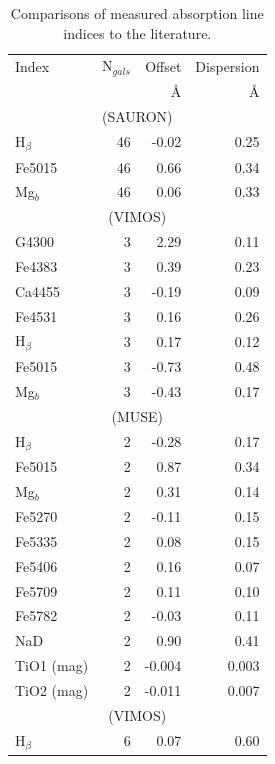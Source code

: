 	\begin{table}
		\centering
	\begin{threeparttable}
		\caption{Comparisons of measured absorption line indices to the literature.}
		\label{tab:litAbsorption}
		\begin{tabular}{l r r r}
			\hline
			\hline
			Index 		& N$_{gals}$ & Offset 	& Dispersion \\
						& 			& \AA		& \AA \\
			\hline
			\multicolumn{4}{c}{\citet{Vazdekis2010} (SAURON)} \\
			\hline
			H$_\beta$ 	& 46		& -0.02		& 0.25	\\
			Fe5015		& 46		& 0.66		& 0.34	\\
			Mg$_b$ 		& 46		& 0.06		& 0.33	\\
			\hline
			\multicolumn{4}{c}{\citet{Rampazzo2005} (VIMOS)} \\
			\hline
			G4300 		& 3 		& 2.29		& 0.11	\\
			Fe4383 		& 3 		& 0.39		& 0.23	\\
			Ca4455 		& 3 		& -0.19		& 0.09	\\
			Fe4531 		& 3 		& 0.16		& 0.26	\\
			H$_\beta$ 	& 3 		& 0.17		& 0.12	\\
			Fe5015 		& 3 		& -0.73		& 0.48	\\
			Mg$_b$ 		& 3 		& -0.43		& 0.17	\\
			\hline
			\multicolumn{4}{c}{\citet{Rampazzo2005} (MUSE)} \\
			\hline
			H$_\beta$ 	& 2 		& -0.28		& 0.17	\\ 
			Fe5015 		& 2 		& 0.87		& 0.34	\\ 
			Mg$_b$ 		& 2 		& 0.31		& 0.14	\\
			Fe5270 		& 2 		& -0.11		& 0.15	\\
			Fe5335 		& 2 		& 0.08		& 0.15	\\
			Fe5406 		& 2 		& 0.16		& 0.07	\\
			Fe5709 		& 2 		& 0.11		& 0.10	\\
			Fe5782 		& 2 		& -0.03		& 0.11	\\
			NaD 		& 2 		& 0.90		& 0.41	\\
			TiO1 (mag)	& 2 		& -0.004	& 0.003	\\
			TiO2 (mag)	& 2 		& -0.011	& 0.007	\\
			\hline
			\multicolumn{4}{c}{\citet{Ogando2008} (VIMOS)} \\
			\hline
			H$_\beta$ 	& 6 		& 0.07		& 0.60	\\

\end{tabular}
\end{threeparttable}
\end{table}
